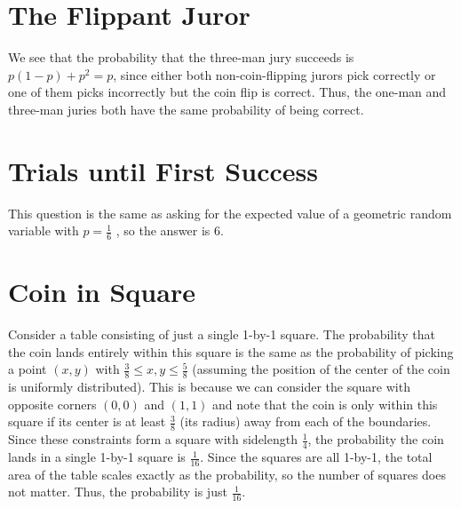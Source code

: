 \documentclass{article}
\begin{document}
\section{The Flippant Juror}
We see that the probability that the three-man jury succeeds is $p(1-p) + p^2 = p$, since either both 
non-coin-flipping jurors pick correctly or one of them picks incorrectly but the coin flip is correct.
Thus, the one-man and three-man juries both have the same probability of being correct.

\section{Trials until First Success}
This question is the same as asking for the expected value of a geometric random variable with $p = \frac{1}{6}$
, so the answer is 6.

\section{Coin in Square}
Consider a table consisting of just a single 1-by-1 square. The probability that the coin lands entirely within
this square is the same as  the probability of picking a point $(x, y)$ with $\frac{3}{8} \leq x, y \leq
\frac{5}{8}$ (assuming the position of the center of the coin is uniformly distributed). 
This is because we can consider the square with opposite corners $(0, 0)$ and $(1, 1)$ and note
that the coin is only within this square if its center is at least $\frac{3}{8}$ (its radius) away from each
of the boundaries. Since these constraints form a square with sidelength $\frac{1}{4}$, the probability the
coin lands in a single 1-by-1 square is $\frac{1}{16}$. Since the squares are all 1-by-1, the total area of the
table scales exactly as the probability, so the number of squares does not matter. Thus, the probability
is just $\frac{1}{16}$.
\end{document}
